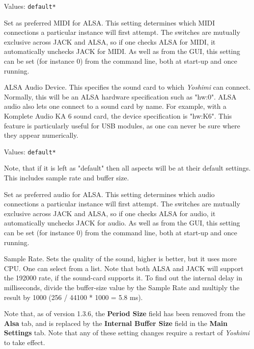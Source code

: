    Values: \texttt{default*}

   Set as preferred MIDI for ALSA.
   This setting determines which MIDI connections a particular instance will
   first attempt. The switches are mutually exclusive across JACK and ALSA,
   so if one checks ALSA for MIDI, it automatically unchecks JACK for MIDI.
   As well as from the GUI, this setting can be set (for instance 0) from the
   command line, both at start-up and once running.

   ALSA Audio Device.
   This specifies the sound card to which \textsl{Yoshimi} can connect.
   Normally, this will be an ALSA hardware specification such as
   "hw:0".
   ALSA audio also lets one connect to a sound card by name. For example,
   with a Komplete Audio KA 6 sound card, the device specification is
   "hw:K6". This feature is particularly useful for USB modules, as one can
   never be sure where they appear numerically.

   Values: \texttt{default*}

   Note, that if it is left as "default" then all aspects will be at their
   default settings. This includes sample rate and buffer size.

   Set as preferred audio for ALSA.
   This setting determines which audio connections a particular instance will
   first attempt. The switches are mutually exclusive across JACK and ALSA,
   so if one checks ALSA for audio, it automatically unchecks JACK for audio.
   As well as from the GUI, this setting can be set (for instance 0) from the
   command line, both at start-up and once running.

   Sample Rate.
   Sets the quality of the sound, higher is better, but it uses more CPU.  One
   can select from a list.  Note that both ALSA and JACK will support the
   192000 rate, if the sound-card supports it.  To find out the internal delay
   in milliseconds, divide the buffer-size value by the Sample Rate and
   multiply the result by 1000 (256 / 44100 * 1000 = 5.8 ms).

   Note that, as of version 1.3.6, the \textbf{Period Size} field has been
   removed from the \textbf{Alsa} tab, and is replaced by the
   \textbf{Internal Buffer Size} field in the \textbf{Main Settings} tab.
   Note that any of these setting changes require a restart of \textsl{Yoshimi}
   to take effect.

